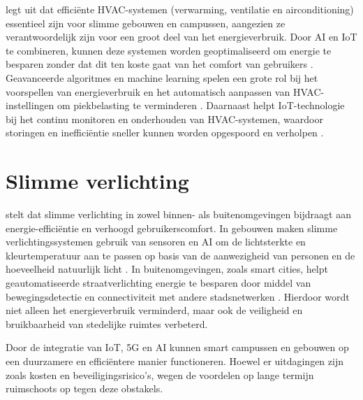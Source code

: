 \textcite{Correia2022} legt uit dat efficiënte HVAC-systemen (verwarming, ventilatie en airconditioning) essentieel zijn voor slimme gebouwen en campussen, aangezien ze verantwoordelijk zijn voor een groot deel van het energieverbruik. Door AI en IoT te combineren, kunnen deze systemen worden geoptimaliseerd om energie te besparen zonder dat dit ten koste gaat van het comfort van gebruikers \autocite{Min_Allah_2020}. Geavanceerde algoritmes en machine learning spelen een grote rol bij het voorspellen van energieverbruik en het automatisch aanpassen van HVAC-instellingen om piekbelasting te verminderen \autocite{Khoa2020}. Daarnaast helpt IoT-technologie bij het continu monitoren en onderhouden van HVAC-systemen, waardoor storingen en inefficiëntie sneller kunnen worden opgespoord en verholpen \autocite{Zhang2022}.

\section{Slimme verlichting}

\textcite{Poyyamozhi2024} stelt dat slimme verlichting in zowel binnen- als buitenomgevingen bijdraagt aan energie-efficiëntie en verhoogd gebruikerscomfort. In gebouwen maken slimme verlichtingssystemen gebruik van sensoren en AI om de lichtsterkte en kleurtemperatuur aan te passen op basis van de aanwezigheid van personen en de hoeveelheid natuurlijk licht \autocite{Wang2024}. In buitenomgevingen, zoals smart cities, helpt geautomatiseerde straatverlichting energie te besparen door middel van bewegingsdetectie en connectiviteit met andere stadsnetwerken \autocite{Huseien_2022}. Hierdoor wordt niet alleen het energieverbruik verminderd, maar ook de veiligheid en bruikbaarheid van stedelijke ruimtes verbeterd.

Door de integratie van IoT, 5G en AI kunnen smart campussen en gebouwen op een duurzamere en efficiëntere manier functioneren. Hoewel er uitdagingen zijn zoals kosten en beveiligingsrisico’s, wegen de voordelen op lange termijn ruimschoots op tegen deze obstakels.






